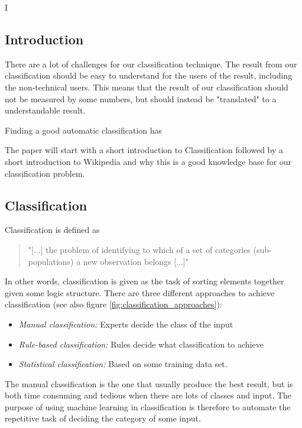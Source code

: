 \documentclass[11pt,english,a4paper]{article}
\begin{document}
I\subsection*{Introduction}

There are a lot of challenges for our classification technique. The result from our classification should be easy to understand for the users of the result, including the non-technical users. This means that the result of our classification should not be measured by some numbers, but should instead be "translated" to a understandable result. 



Finding a good automatic classification has


The paper will start with a short introduction to Classification followed by a short introduction to Wikipedia and why this is a good knowledge base for our classification problem. 

\subsection*{Classification}
Classification is defined as 
\begin{quote}
"[...] the problem of identifying to which of a set of categories (sub-populations) a new observation belongs [...]" %
\end{quote}
In other words, classification is given as the task of sorting elements together given some logic structure. There are three different approaches to achieve classification (see also figure \ref{fig:classification_approaches}): 
\begin{itemize}
\item \textit{Manual classification:} Experts decide the class of the input
\item \textit{Rule-based classification:} Rules decide what classification to achieve
\item \textit{Statistical classification:} Based on some training data set. 
\end{itemize}
The manual classification is the one that usually produce the best result, but is both time consuming and tedious when there are lots of classes and input. The purpose of using machine learning in classification is therefore to automate the repetitive task of deciding the category of some input.
\end{document}

